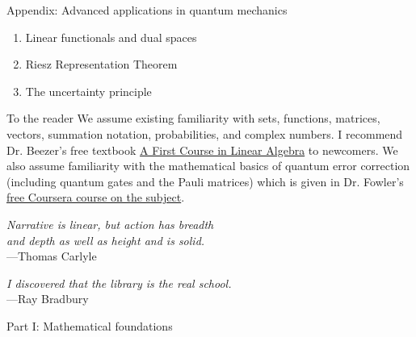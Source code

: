 \documentclass{beamer}
\begin{document}
\begin{frame}{Appendix: Advanced applications in quantum mechanics}
\begin{enumerate}
    \item Linear functionals and dual spaces
    \item Riesz Representation Theorem
    \item The uncertainty principle
\end{enumerate}
\end{frame}

\begin{frame}{To the reader}
We assume existing familiarity with sets, functions, matrices, vectors, summation notation, probabilities, and complex numbers. I recommend Dr. Beezer's free textbook \href{http://linear.ups.edu}{A First Course in Linear Algebra} to newcomers. We also assume familiarity with the mathematical basics of quantum error correction (including quantum gates and the Pauli matrices) which is given in Dr. Fowler's \href{https://www.coursera.org/learn/quantum-error-correction}{free Coursera course on the subject}.
\begin{flushright}
    \textit{Narrative is linear, but action has breadth\\and depth as well as height and is solid.}\\---Thomas Carlyle
\end{flushright}

\begin{flushright}
    \textit{I discovered that the library is the real school.}\\---Ray Bradbury
\end{flushright}
\end{frame}

\begin{frame}{Part I: Mathematical foundations}

\end{frame}
\end{document}
